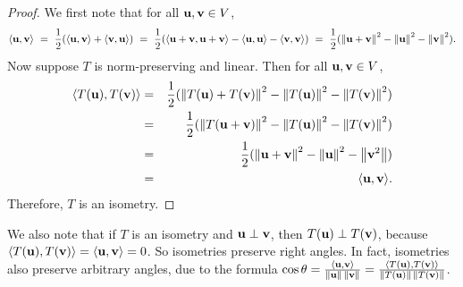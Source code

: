 \begin{proof}
  We first note that for all $\vect{u},\vect{v}\in V$,
  \begin{equation*}
    \iprod{\vect{u},\vect{v}}
    ~=~ \frac{1}{2}(\iprod{\vect{u},\vect{v}} + \iprod{\vect{v},\vect{u}})
    ~=~ \frac{1}{2}(\iprod{\vect{u}+\vect{v},\vect{u}+\vect{v}}
    - \iprod{\vect{u},\vect{u}} - \iprod{\vect{v},\vect{v}})
    ~=~ \frac{1}{2}(\norm{\vect{u}+\vect{v}}^2
    - \norm{\vect{u}}^2 - \norm{\vect{v}}^2).
  \end{equation*}
  Now suppose $T$ is norm-preserving and linear. Then for all
  $\vect{u},\vect{v}\in V$,
  \begin{eqnarray*}
    \iprod{T(\vect{u}),T(\vect{v})}
    &=& \frac{1}{2}(\norm{T(\vect{u})+T(\vect{v})}^2 - \norm{T(\vect{u})}^2 -
        \norm{T(\vect{v})}^2) \\
    &=& \frac{1}{2}(\norm{T(\vect{u}+\vect{v})}^2 - \norm{T(\vect{u})}^2 -
        \norm{T(\vect{v})}^2) \\
    &=& \frac{1}{2}(\norm{\vect{u}+\vect{v}}^2 -
        \norm{\vect{u}}^2 - \norm{\vect{v}^2}) \\
    &=& \iprod{\vect{u},\vect{v}}.
  \end{eqnarray*}
  Therefore, $T$ is an isometry.
\end{proof}

We also note that if $T$ is an isometry and $\vect{u}\orth\vect{v}$,
then $T(\vect{u})\orth T(\vect{v})$, because
$\iprod{T(\vect{u}),T(\vect{v})} = \iprod{\vect{u},\vect{v}} = 0$. So
isometries preserve right angles. In fact, isometries also preserve
arbitrary angles, due to the formula
$\cos\theta =
\frac{\iprod{\vect{u},\vect{v}}}{\norm{\vect{u}}\,\norm{\vect{v}}} =
\frac{\iprod{T(\vect{u}),T(\vect{v})}}
{\norm{T(\vect{u})}\,\norm{T(\vect{v})}}$.

